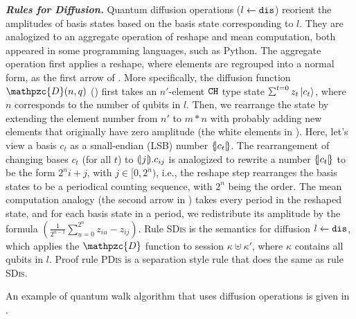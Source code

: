 \noindent\textbf{\textit{Rules for Diffusion.}}\label{sec:diffuse}
Quantum diffusion operations (${l} \xleftarrow{} {\texttt{dis}}$) reorient the amplitudes of basis states based on the basis state corresponding to $l$. They are analogized to an aggregate operation of reshape and mean computation, both appeared in some programming languages, such as Python.
The aggregate operation first applies a reshape, where elements are regrouped into a normal form, as the first arrow of . More specifically, the diffusion function $\mathpzc{D}(n,q)$ () first takes an $n'$-element $\texttt{CH}$ type state $\schi{t=0}{z_t}{c_t}$, where $n$ corresponds to the number of qubits in $l$.
Then, we rearrange the state by extending the element number from $n'$ to $m*n$ with probably adding new elements that originally have zero amplitude (the white elements in ).
Here, let's view a basis $c_{t}$ as a small-endian (LSB) number $\{\hspace{-0.2em}| c_{t} |\hspace{-0.2em}\}$. The rearrangement of changing bases $c_{t}$ (for all $t$) to $(\!| j |\!).c_{ij}$ is analogized to rewrite a number $\{\hspace{-0.2em}| c_{t} |\hspace{-0.2em}\}$ to be the form $2^n i+j$, with $j\in [0,2^n)$,
i.e., the reshape step rearranges the basis states to be a periodical counting sequence, with $2^n$ being the order.
The mean computation analogy (the second arrow in ) takes every period in the reshaped state, and for each basis state in a period, we redistribute its amplitude by the formula $(\frac{1}{2^{n-1}}\sum_{u=0}^{2^n}z_{iu} - z_{ij})$.
Rule \textsc{SDis} is the semantics for diffusion ${l} \xleftarrow{} {\texttt{dis}}$, which applies the $\mathpzc{D}$ function to session $\kappa \uplus \kappa'$, where $\kappa$ contains all qubits in $l$. Proof rule \textsc{PDis} is a separation style rule that does the same as rule \textsc{SDis}.
An example of quantum walk algorithm that uses diffusion operations is given in .

